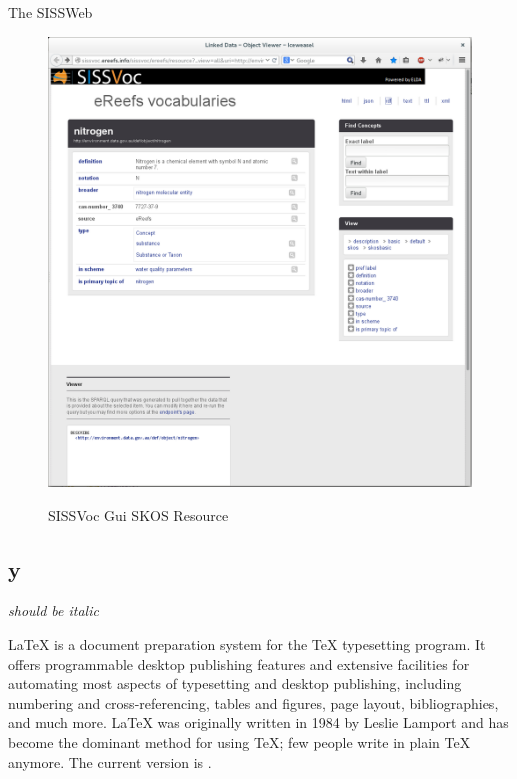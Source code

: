 \documentclass[10pt,a4paper]{article}
\begin{document}
\begin{flushleft}
The SISSWeb

\begin{figure}[H]
\centering
\caption{SISSVoc Gui SKOS Resource }
\includegraphics[width=12cm]{nitrogen}  
\label{fig:test}
\end{figure}






\subsection{y}






  \end{flushleft}


  \textit{should be italic}


\LaTeX{} is a document preparation system for the \TeX{}
  typesetting program. It offers programmable desktop
  publishing features and extensive facilities for
  automating most aspects of typesetting and desktop
  publishing, including numbering and cross-referencing,
  tables and figures, page layout, bibliographies, and
  much more. \LaTeX{} was originally written in 1984 by
  Leslie Lamport and has become the dominant method for
  using \TeX; few people write in plain \TeX{} anymore.
  The current version is \LaTeXe.
\end{document}

